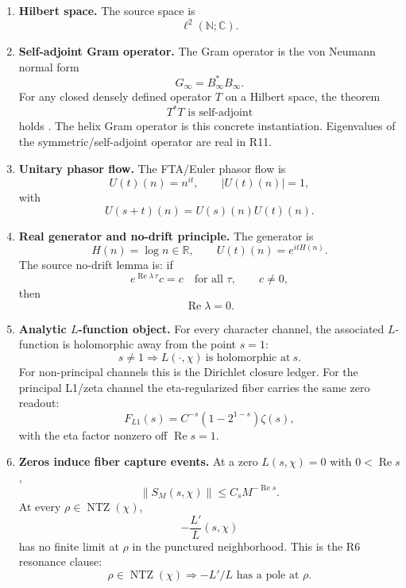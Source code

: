 \documentclass[11pt]{article}
\DeclareMathOperator{\Ree}{Re}
\DeclareMathOperator{\NTZ}{NTZ}
\begin{document}
\begin{enumerate}[label=R\arabic*., leftmargin=2cm]
\item \textbf{Hilbert space.}
The source space is
\[
  \ell^2(\mathbb N;\mathbb C).
\]
\item \textbf{Self-adjoint Gram operator.}
The Gram operator is the von Neumann normal form
\[
  G_\infty=B_\infty^*B_\infty .
\]
For any closed densely defined operator $T$ on a Hilbert space, the theorem
\[
  T^*T \text{ is self-adjoint}
\]
holds \cite{ReedSimon1980}.  The helix Gram operator is this concrete
instantiation.  Eigenvalues of
the symmetric/self-adjoint operator are real in R11.

\item \textbf{Unitary phasor flow.}
The FTA/Euler phasor flow is
\[
  U(t)(n)=n^{it},\qquad |U(t)(n)|=1,
\]
with
\[
  U(s+t)(n)=U(s)(n)U(t)(n).
\]
\item \textbf{Real generator and no-drift principle.}
The generator is
\[
  H(n)=\log n\in\mathbb R,\qquad U(t)(n)=e^{itH(n)}.
\]
The source no-drift lemma is:
if
\[
  e^{\Ree\lambda\,\tau}c=c\quad\text{for all }\tau,\qquad c\ne0,
\]
then
\[
  \Ree\lambda=0.
\]
\item \textbf{Analytic $L$-function object.}
For every character channel, the associated $L$-function is holomorphic away from
the point $s=1$:
\[
  s\ne1\Longrightarrow
  L(\cdot,\chi)\ \text{is holomorphic at}\ s.
\]
For non-principal channels this is the Dirichlet closure ledger.  For the
principal L1/zeta channel the eta-regularized fiber carries the same zero
readout:
\[
  F_{L1}(s)=C^{-s}(1-2^{1-s})\zeta(s),
\]
with the eta factor nonzero off $\Ree s=1$.

\item \textbf{Zeros induce fiber capture events.}
At a zero $L(s,\chi)=0$ with $0<\Ree s$,
\[
  \|S_M(s,\chi)\|\le C_s M^{-\Ree s}.
\]
At every $\rho\in\NTZ(\chi)$,
\[
  -\frac{L'}{L}(s,\chi)
\]
has no finite limit at $\rho$ in the punctured neighborhood.
This is the R6 resonance clause:
\[
  \rho\in\NTZ(\chi)\Longrightarrow
  -L'/L\text{ has a pole at }\rho.
\]


\end{enumerate}
\end{document}
